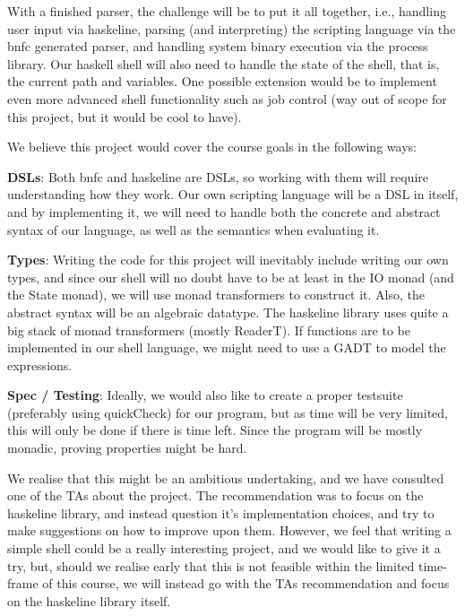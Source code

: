 \documentclass[11pt,a4paper]{article}
\begin{document}
With a finished parser, the challenge will be to put it all together, i.e.,
handling user input via haskeline, parsing (and interpreting) the scripting
language via the bnfc generated parser, and handling system binary execution via
the process library. Our haskell shell will also need to handle the state of the
shell, that is, the current path and variables. One possible extension would be
to implement even more advanced shell functionality such as job control (way out
of scope for this project, but it would be cool to have).


We believe this project would cover the course goals in the following ways:

\textbf{DSLs}: Both bnfc and haskeline are DSLs, so working with them will require
understanding how they work. Our own scripting language will be a DSL in itself,
and by implementing it, we will need to handle both the concrete and abstract
syntax of our language, as well as the semantics when evaluating it.

\textbf{Types}: Writing the code for this project will inevitably include writing our own
types, and since our shell will no doubt have to be at least in the IO monad
(and the State monad), we will use monad transformers to construct it. Also, the
abstract syntax will be an algebraic datatype.  The haskeline library uses quite
a big stack of monad transformers (mostly ReaderT). If functions are to be
implemented in our shell language, we might need to use a GADT to model the
expressions.

\textbf{Spec / Testing}: Ideally, we would also like to create  a proper testsuite
(preferably using quickCheck) for our program, but as time will be very limited,
this will only be done if there is time left. Since the program will be mostly
monadic, proving properties might be hard.

We realise that this might be an ambitious undertaking, and we have consulted
one of the TAs about the project. The recommendation was to focus on the
haskeline library, and instead question it’s implementation choices, and try to
make suggestions on how to improve upon them. However, we feel that writing a
simple shell could be a really interesting project, and we would like to give it
a try, but, should we realise early that this is not feasible within the limited
time-frame of this course, we will instead go with the TAs recommendation and
focus on the haskeline library itself.
\end{document}
